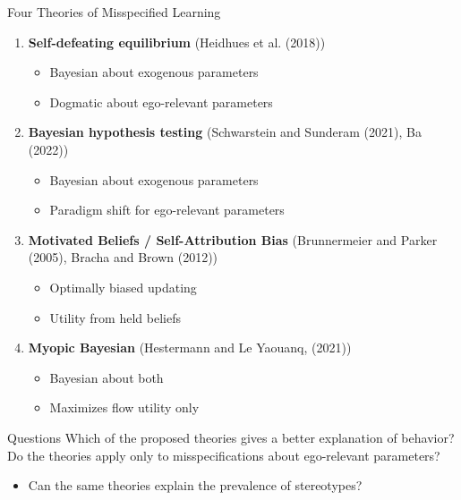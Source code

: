 \documentclass[aspectratio=169]{beamer}
\begin{document}
\begin{frame}{Four Theories of Misspecified Learning}
    
    \begin{enumerate}

        \item \textbf{Self-defeating equilibrium} (Heidhues et al. (2018)) \\
        \begin{itemize}
            \item Bayesian about exogenous parameters
            \item Dogmatic about ego-relevant parameters
        \end{itemize}
        \bigskip

        \item \textbf{Bayesian hypothesis testing} (Schwarstein and Sunderam (2021), Ba (2022))\\
        \begin{itemize}
            \item Bayesian about exogenous parameters 
            \item Paradigm shift for ego-relevant parameters
        \end{itemize}
        \bigskip

        \item \textbf{Motivated Beliefs / Self-Attribution Bias} (Brunnermeier and Parker (2005), Bracha and Brown (2012)) \\
        \begin{itemize}
            \item Optimally biased updating
            \item Utility from held beliefs 
        \end{itemize}
        \bigskip

        \item \textbf{Myopic Bayesian} (Hestermann and Le Yaouanq, (2021))\\
        \begin{itemize}
            \item Bayesian about both 
            \item Maximizes flow utility only
        \end{itemize}

    \end{enumerate}
    
\end{frame}

\begin{frame}{Questions}
    Which of the proposed theories gives a better explanation of behavior?\\
    \bigskip
    Do the theories apply only to misspecifications about ego-relevant parameters?\\
    \begin{itemize}
        \item Can the same theories explain the prevalence of stereotypes?
        
    \end{itemize}
\end{frame}
\end{document}
